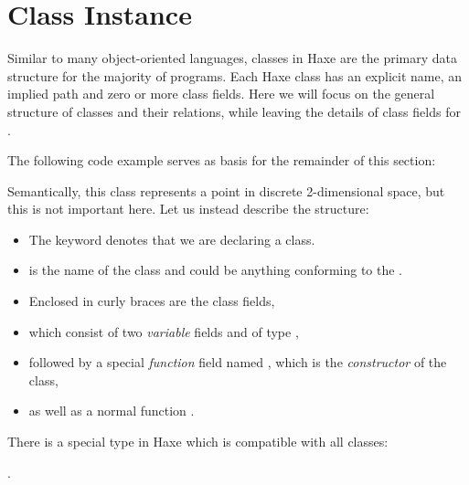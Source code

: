 
\section{Class Instance}
\label{types-class-instance}

Similar to many object-oriented languages, classes in Haxe are the primary data structure for the majority of programs. Each Haxe class has an explicit name, an implied path and zero or more class fields. Here we will focus on the general structure of classes and their relations, while leaving the details of class fields for .

The following code example serves as basis for the remainder of this section:


Semantically, this class represents a point in discrete 2-dimensional space, but this is not important here. Let us instead describe the structure:

\begin{itemize}
	\item The keyword  denotes that we are declaring a class.
	\item {} is the name of the class and could be anything conforming to the .
	\item Enclosed in curly braces \expr{$\left\{\right\}$} are the class fields,
	\item which consist of two \emph{variable} fields  and  of type ,
	\item followed by a special \emph{function} field named , which is the \emph{constructor} of the class,
	\item as well as a normal function .
\end{itemize}
There is a special type in Haxe which is compatible with all classes:

.

